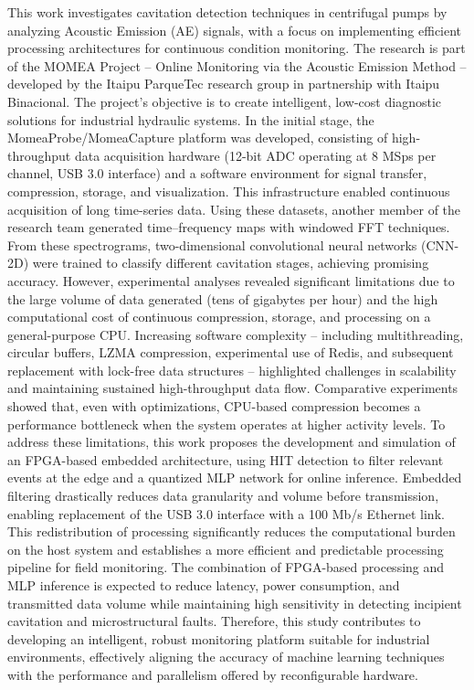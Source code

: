 \documentclass[
	12pt,				%
	oneside,
	a4paper,			%
	english,			%
	french,				%
	spanish,			%
	brazil				%
	]{abntex2}
\begin{document}
\begin{resumo}[Abstract]
This work investigates cavitation detection techniques in centrifugal pumps by analyzing Acoustic Emission (AE) signals, with a focus on implementing efficient processing architectures for continuous condition monitoring. The research is part of the MOMEA Project – Online Monitoring via the Acoustic Emission Method – developed by the Itaipu ParqueTec research group in partnership with Itaipu Binacional. The project's objective is to create intelligent, low-cost diagnostic solutions for industrial hydraulic systems.
In the initial stage, the MomeaProbe/MomeaCapture platform was developed, consisting of high-throughput data acquisition hardware (12-bit ADC operating at 8 MSps per channel, USB 3.0 interface) and a software environment for signal transfer, compression, storage, and visualization. This infrastructure enabled continuous acquisition of long time-series data. Using these datasets, another member of the research team generated time–frequency maps with windowed FFT techniques. From these spectrograms, two-dimensional convolutional neural networks (CNN-2D) were trained to classify different cavitation stages, achieving promising accuracy.
However, experimental analyses revealed significant limitations due to the large volume of data generated (tens of gigabytes per hour) and the high computational cost of continuous compression, storage, and processing on a general-purpose CPU. Increasing software complexity – including multithreading, circular buffers, LZMA compression, experimental use of Redis, and subsequent replacement with lock-free data structures – highlighted challenges in scalability and maintaining sustained high-throughput data flow. Comparative experiments showed that, even with optimizations, CPU-based compression becomes a performance bottleneck when the system operates at higher activity levels.
To address these limitations, this work proposes the development and simulation of an FPGA-based embedded architecture, using HIT detection to filter relevant events at the edge and a quantized MLP network for online inference. Embedded filtering drastically reduces data granularity and volume before transmission, enabling replacement of the USB 3.0 interface with a 100 Mb/s Ethernet link. This redistribution of processing significantly reduces the computational burden on the host system and establishes a more efficient and predictable processing pipeline for field monitoring.
The combination of FPGA-based processing and MLP inference is expected to reduce latency, power consumption, and transmitted data volume while maintaining high sensitivity in detecting incipient cavitation and microstructural faults. Therefore, this study contributes to developing an intelligent, robust monitoring platform suitable for industrial environments, effectively aligning the accuracy of machine learning techniques with the performance and parallelism offered by reconfigurable hardware.
\end{resumo}
\end{document}
